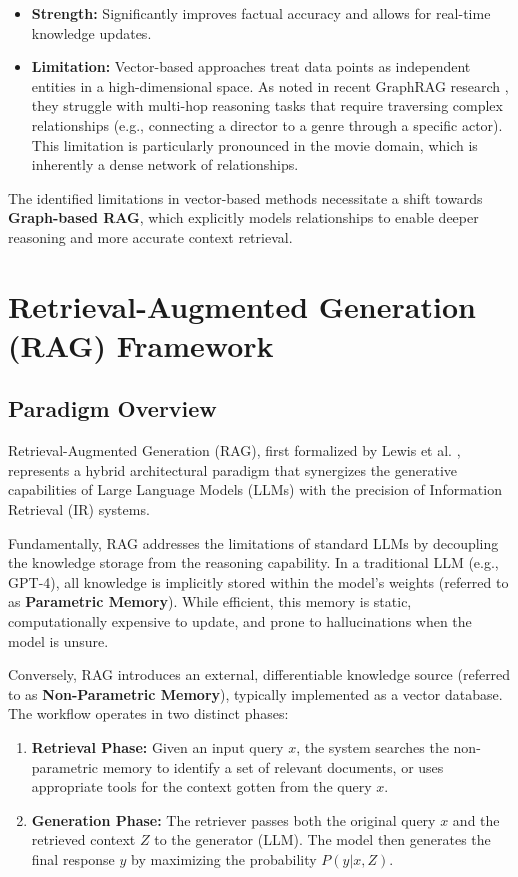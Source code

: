 \documentclass[a4paper, 12pt]{extreport}
\begin{document}
\begin{itemize}
    \item[] \textbf{Strength:} Significantly improves factual accuracy and allows for real-time knowledge updates.
    \item[] \textbf{Limitation:} Vector-based approaches treat data points as independent entities in a high-dimensional space. As noted in recent GraphRAG research \cite{han2025retrievalaugmentedgenerationgraphsgraphrag}, they struggle with multi-hop reasoning tasks that require traversing complex relationships (e.g., connecting a director to a genre through a specific actor). This limitation is particularly pronounced in the movie domain, which is inherently a dense network of relationships.
\end{itemize}

The identified limitations in vector-based methods necessitate a shift towards \textbf{Graph-based RAG}, which explicitly models relationships to enable deeper reasoning and more accurate context retrieval.
\section{Retrieval-Augmented Generation (RAG) Framework}
\label{sec:rag_framework}
    \subsection{Paradigm Overview}
Retrieval-Augmented Generation (RAG), first formalized by Lewis et al. \cite{lewis2020rag}, represents a hybrid architectural paradigm that synergizes the generative capabilities of Large Language Models (LLMs) with the precision of Information Retrieval (IR) systems.

Fundamentally, RAG addresses the limitations of standard LLMs by decoupling the knowledge storage from the reasoning capability. In a traditional LLM (e.g., GPT-4), all knowledge is implicitly stored within the model's weights (referred to as \textbf{Parametric Memory}). While efficient, this memory is static, computationally expensive to update, and prone to hallucinations \cite{maynez-etal-2020-faithfulness} when the model is unsure.

Conversely, RAG introduces an external, differentiable knowledge source (referred to as \textbf{Non-Parametric Memory}), typically implemented as a vector database. The workflow operates in two distinct phases:

\begin{enumerate}
    \item \textbf{Retrieval Phase:} Given an input query $x$, the system searches the non-parametric memory to identify a set of relevant documents, or uses appropriate tools for the context gotten from the query $x$.
    \item \textbf{Generation Phase:} The retriever passes both the original query $x$ and the retrieved context $Z$ to the generator (LLM). The model then generates the final response $y$ by maximizing the probability $P(y | x, Z)$.
\end{enumerate}
\end{document}
